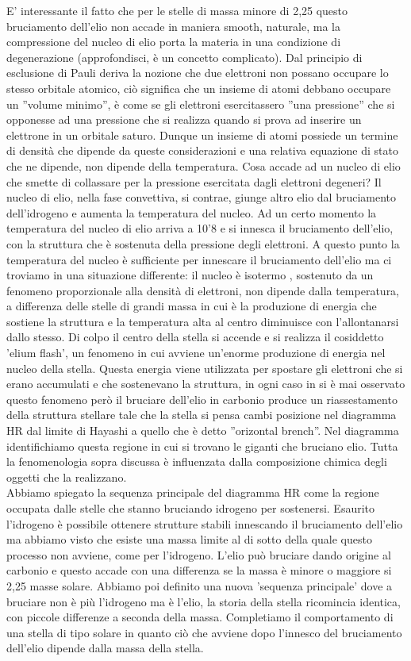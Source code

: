 \documentclass[a4paper,11pt]{article}
\begin{document}
    E' interessante il fatto che per le stelle di massa minore di 2,25 questo bruciamento dell'elio non accade in maniera smooth, naturale, ma la compressione del nucleo di elio porta la materia in una condizione di degenerazione (approfondisci, è un concetto complicato). Dal principio di esclusione di Pauli deriva la nozione che due elettroni non possano occupare lo stesso orbitale atomico, ciò significa che un insieme di atomi debbano occupare un ''volume minimo'', è come se gli elettroni esercitassero ''una pressione'' che si opponesse ad una pressione che si realizza quando si prova ad inserire un elettrone in un orbitale saturo. Dunque un insieme di atomi possiede un termine di densità che dipende da queste considerazioni e una relativa equazione di stato che ne dipende, non dipende della temperatura. Cosa accade ad un nucleo di elio che smette di collassare per la pressione esercitata dagli elettroni degeneri? Il nucleo di elio, nella fase convettiva, si contrae, giunge altro elio dal bruciamento dell'idrogeno e aumenta la temperatura del nucleo. Ad un certo momento la temperatura del nucleo di elio arriva a 10'8 e si innesca il bruciamento dell'elio, con la struttura che è sostenuta della pressione degli elettroni. A questo punto la temperatura del nucleo è sufficiente per innescare il bruciamento dell'elio ma ci troviamo in una situazione differente: il nucleo è isotermo , sostenuto da un fenomeno proporzionale alla densità di elettroni, non dipende dalla temperatura, a differenza delle stelle di grandi massa in cui è la produzione di energia che sostiene la struttura e la temperatura alta al centro diminuisce con l'allontanarsi dallo stesso. Di colpo il centro della stella si accende e si realizza il cosiddetto 'elium flash', un fenomeno in cui avviene un'enorme produzione di energia nel nucleo della stella. Questa energia viene utilizzata per spostare gli elettroni che si erano accumulati e che sostenevano la struttura, in ogni caso in si è mai osservato questo fenomeno però il bruciare dell'elio in carbonio produce un riassestamento della struttura stellare tale che la stella si pensa cambi posizione nel diagramma HR dal limite di Hayashi a quello che è detto ''orizontal brench''. Nel diagramma identifichiamo questa regione in cui si trovano le giganti che bruciano elio. Tutta la fenomenologia sopra discussa è influenzata dalla composizione chimica degli oggetti che la realizzano.\\
    Abbiamo spiegato la sequenza principale del diagramma HR come la regione occupata dalle stelle che stanno bruciando idrogeno per sostenersi. Esaurito l'idrogeno è possibile ottenere strutture stabili innescando il bruciamento dell'elio ma abbiamo visto che esiste una massa limite al di sotto della quale questo processo non avviene, come per l'idrogeno. L'elio può bruciare dando origine al carbonio e questo accade con una differenza se la massa è minore o maggiore si 2,25 masse solare. Abbiamo poi definito una nuova 'sequenza principale' dove a bruciare non è più l'idrogeno ma è l'elio, la storia della stella ricomincia identica, con piccole differenze a seconda della massa. Completiamo il comportamento di una stella di tipo solare in quanto ciò che avviene dopo l'innesco del bruciamento dell'elio dipende dalla massa della stella.\\
\end{document}
